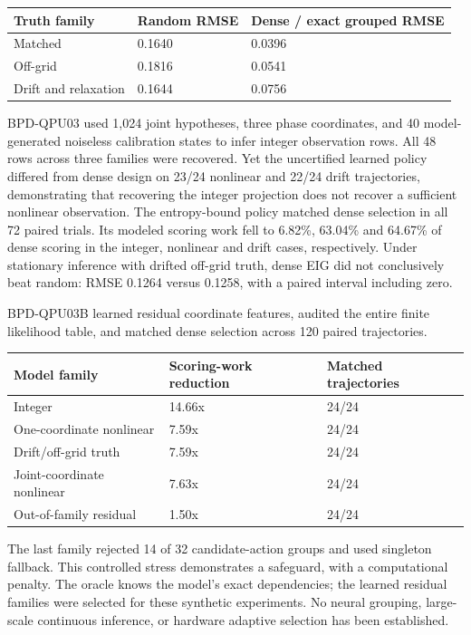 \documentclass[11pt,a4paper]{article}
\begin{document}
\begin{center}
\centering
\normalsize
\begin{tabularx}{\linewidth}{@{}YYY@{}}
\toprule
Truth family & Random RMSE & Dense / exact grouped RMSE \\
\midrule
Matched & 0.1640 & 0.0396 \\
Off-grid & 0.1816 & 0.0541 \\
Drift and relaxation & 0.1644 & 0.0756 \\
\bottomrule
\end{tabularx}
\end{center}

BPD-QPU03 used 1,024 joint hypotheses, three phase coordinates, and 40 model-generated noiseless calibration states to infer integer observation rows. All 48 rows across three families were recovered. Yet the uncertified learned policy differed from dense design on 23/24 nonlinear and 22/24 drift trajectories, demonstrating that recovering the integer projection does not recover a sufficient nonlinear observation. The entropy-bound policy matched dense selection in all 72 paired trials. Its modeled scoring work fell to 6.82\%, 63.04\% and 64.67\% of dense scoring in the integer, nonlinear and drift cases, respectively. Under stationary inference with drifted off-grid truth, dense EIG did not conclusively beat random: RMSE 0.1264 versus 0.1258, with a paired interval including zero.

BPD-QPU03B learned residual coordinate features, audited the entire finite likelihood table, and matched dense selection across 120 paired trajectories.

\begin{center}
\centering
\normalsize
\begin{tabularx}{\linewidth}{@{}YYY@{}}
\toprule
Model family & Scoring-work reduction & Matched trajectories \\
\midrule
Integer & 14.66x & 24/24 \\
One-coordinate nonlinear & 7.59x & 24/24 \\
Drift/off-grid truth & 7.59x & 24/24 \\
Joint-coordinate nonlinear & 7.63x & 24/24 \\
Out-of-family residual & 1.50x & 24/24 \\
\bottomrule
\end{tabularx}
\end{center}

The last family rejected 14 of 32 candidate-action groups and used singleton fallback. This controlled stress demonstrates a safeguard, with a computational penalty. The oracle knows the model's exact dependencies; the learned residual families were selected for these synthetic experiments. No neural grouping, large-scale continuous inference, or hardware adaptive selection has been established.
\end{document}
